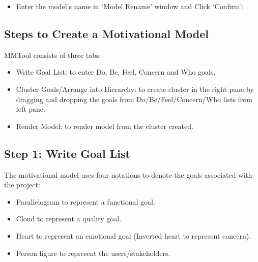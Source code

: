 \documentclass[letterpaper,10pt,english]{jupyterBook}
\begin{document}
\sphinxAtStartPar
{}
\begin{itemize}
\item {} 
\sphinxAtStartPar
Enter the model’s name in ‘Model Rename’ window and Click ‘Confirm’:

\end{itemize}

\sphinxAtStartPar
{}


\subsection{Steps to Create a Motivational Model}
\label{\detokenize{appendices/appendix_b/motivational_model_guide:steps-to-create-a-motivational-model}}
\sphinxAtStartPar
MMTool consists of three tabs:
\begin{itemize}
\item {} 
\sphinxAtStartPar
Write Goal List: to enter Do, Be, Feel, Concern and Who goals.

\item {} 
\sphinxAtStartPar
Cluster Goals/Arrange into Hierarchy: to create cluster in the
right pane by dragging and dropping the goals from
Do/Be/Feel/Concern/Who lists from left pane.

\item {} 
\sphinxAtStartPar
Render Model: to render model from the cluster created.

\end{itemize}


\subsection{Step 1: Write Goal List}
\label{\detokenize{appendices/appendix_b/motivational_model_guide:step-1-write-goal-list}}
\sphinxAtStartPar
The motivational model uses four notations to denote the goals
associated with the project:
\begin{itemize}
\item {} 
\sphinxAtStartPar
Parallelogram to represent a functional goal.

\item {} 
\sphinxAtStartPar
Cloud to represent a quality goal.

\item {} 
\sphinxAtStartPar
Heart to represent an emotional goal (Inverted heart to represent
concern).

\item {} 
\sphinxAtStartPar
Person figure to represent the users/stakeholders.

\end{itemize}
\end{document}
